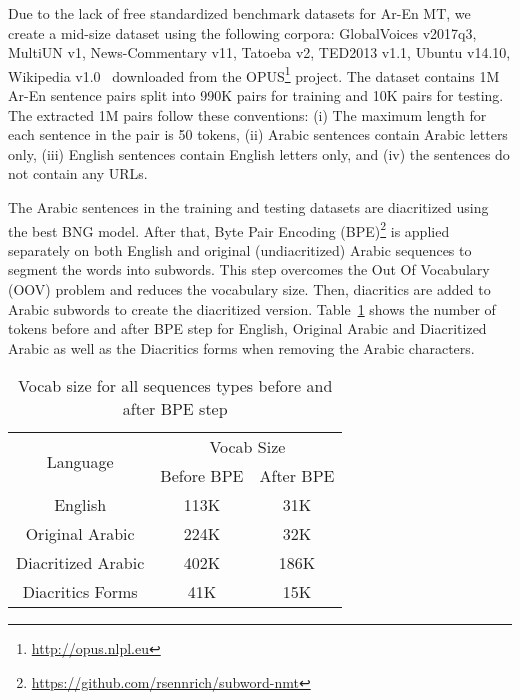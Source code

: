 \documentclass[11pt,a4paper]{article}
\newcommand{\para}[1]{\medskip \noindent {\bf #1}}
\begin{document}
\para{Dataset Extraction and Preparation.}
Due to the lack of free standardized benchmark datasets for Ar-En MT, we create a mid-size dataset using the following corpora: GlobalVoices v2017q3, MultiUN v1, News-Commentary v11, Tatoeba v2, TED2013 v1.1, Ubuntu v14.10, Wikipedia v1.0~\cite{tiedemann2012parallel} downloaded from the OPUS\footnote{\url{http://opus.nlpl.eu}} project. The dataset contains 1M Ar-En sentence pairs split into 990K pairs for training and 10K pairs for testing. The extracted 1M pairs follow these conventions: (i) The maximum length for each sentence in the pair is 50 tokens, (ii) Arabic sentences contain Arabic letters only, (iii) English sentences contain English letters only, and (iv) the sentences do not contain any URLs.

The Arabic sentences in the training and testing datasets are diacritized using the best BNG model. After that, Byte Pair Encoding (BPE)\footnote{\url{https://github.com/rsennrich/subword-nmt}} \cite{sennrich2015neural} is applied separately on both English and original (undiacritized) Arabic sequences to segment the words into subwords. This step overcomes the Out Of Vocabulary (OOV) problem and reduces the vocabulary size. Then, diacritics are added to Arabic subwords to create the diacritized version. Table~\ref{tab:vocab_size} shows the number of tokens before and after BPE step for English, Original Arabic and Diacritized Arabic as well as the Diacritics forms when removing the Arabic characters.

\begin{table}[t]
\centering
\caption{Vocab size for all sequences types before and after BPE step}
\label{tab:vocab_size}
\begin{tabular}{|c|c|c|}
\hline
\multirow{2}{*}{Language} & \multicolumn{2}{c|}{Vocab Size} \\ \cline{2-3} 
                          & Before BPE      & After BPE     \\ \hline
English                   & 113K            & 31K           \\ \hline
Original Arabic                    & 224K            & 32K           \\ \hline
Diacritized Arabic           & 402K            & 186K          \\ \hline
Diacritics Forms          & 41K             & 15K           \\ \hline
\end{tabular}
\end{table}
\end{document}
